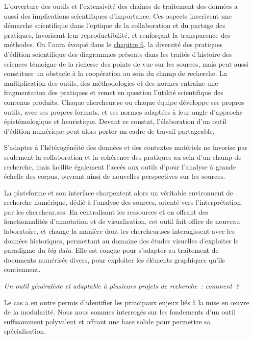 L'ouverture des outils et l'extensivité des chaînes de traitement des données a aussi des implications scientifiques d'importance. Ces aspects inscrivent une démarche scientifique dans l'optique de la collaboration et du partage des pratiques, favorisant leur reproductibilité, et renforçant la transparence des méthodes. On l'aura évoqué dans le \hyperlink{chapitre-6-vers-edition}{chapitre 6}, la diversité des pratiques d'édition scientifique des diagrammes présents dans les traités d'histoire des sciences témoigne de la richesse des points de vue sur les sources, mais peut aussi constituer un obstacle à la coopération au sein du champ de recherche. La multiplication des outils, des méthodologies et des normes entraîne une fragmentation des pratiques et remet en question l'utilité scientifique des contenus produits. Chaque chercheur.se ou chaque équipe développe ses propres outils, avec ses propres formats, et ses normes adaptées à leur angle d'approche épistémologique et heuristique. Devant ce constat, l'élaboration d'un outil d'édition numérique peut alors porter un cadre de travail partageable. 

S'adapter à l'hétérogénéité des données et des contextes matériels ne favorise pas seulement la collaboration et la cohérence des pratiques au sein d'un champ de recherche, mais facilite également l'accès aux outils d'\ia pour l'analyse à grande échelle des corpus, ouvrant ainsi de nouvelles perspectives sur les sources.

La plateforme \aikon et son interface charpentent alors un véritable environnent de recherche numérique, dédié à l'analyse des sources, orienté vers l'interprétation par les chercheur.ses. En centralisant les ressources et en offrant des fonctionnalités d'annotation et de visualisation, cet outil fait office de nouveau laboratoire, et change la manière dont les chercheur.ses interagissent avec les données historiques, permettant au domaine des études visuelles d'exploiter le paradigme du \textit{big data}. Elle est conçue pour s'adapter au traitement de documents numérisés divers, pour exploiter les éléments graphiques qu'ils contiennent.

\textit{Un outil généraliste et adaptable à plusieurs projets de recherche~: comment~?}

Le cas \aikon a en outre permis d'identifier les principaux enjeux liés à la mise en œuvre de la modularité. Nous nous sommes interrogés sur les fondements d'un outil suffisamment polyvalent et offrant une base solide pour permettre sa spécialisation.

